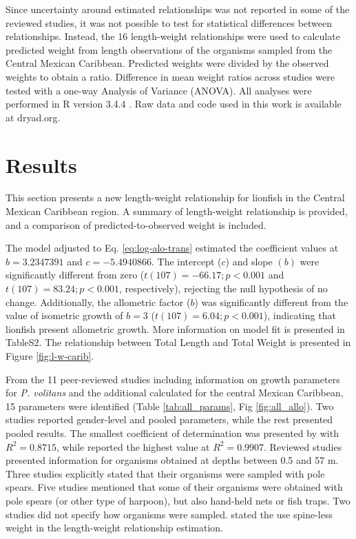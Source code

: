 \documentclass[fleqn,10pt,lineno]{wlpeerj} %
\theoremstyle{definition}
\theoremstyle{definition}
\theoremstyle{definition}
\theoremstyle{remark}
\begin{document}
Since uncertainty around estimated relationships was not reported in
some of the reviewed studies, it was not possible to test for
statistical differences between relationships. Instead, the 16
length-weight relationships were used to calculate predicted weight from
length observations of the organisms sampled from the Central Mexican
Caribbean. Predicted weights were divided by the observed weights to
obtain a ratio. Difference in mean weight ratios across studies were
tested with a one-way Analysis of Variance (ANOVA). All analyses were
performed in R version 3.4.4 \citep{rcore_2018}. Raw data and code used
in this work is available at dryad.org.

\section*{Results}

This section presents a new length-weight relationship for lionfish in
the Central Mexican Caribbean region. A summary of length-weight
relationship is provided, and a comparison of predicted-to-observed
weight is included.

The model adjusted to Eq. \ref{eq:log-alo-trans} estimated the
coefficient values at \(b = 3.2347391\) and \(c = -5.4940866\). The
intercept (\(c\)) and slope \((b)\) were significantly different from
zero (\(t(107) = -66.17; p<0.001\) and \(t(107) = 83.24; p<0.001\),
respectively), rejecting the null hypothesis of no change. Additionally,
the allometric factor (\(b\)) was significantly different from the value
of isometric growth of \(b = 3\) (\(t(107) = 6.04; p<0.001\)),
indicating that lionfish present allometric growth. More information on
model fit is presented in TableS2. The relationship between Total Length
and Total Weight is presented in Figure \ref{fig:l-w-carib}.

From the 11 peer-reviewed studies including information on growth
parameters for \emph{P. volitans} and the additional calculated for the
central Mexican Caribbean, 15 parameters were identified (Table
\ref{tab:all_params}, Fig \ref{fig:all_allo}). Two studies
\citep{aguilarperera_2016,fogg_2013} reported gender-level and pooled
parameters, while the rest presented pooled results. The smallest
coefficient of determination was presented by \citet{chin_2016} with
\(R^2 = 0.8715\), while \citet{sabidoitza_2016} reported the highest
value at \(R^2 = 0.9907\). Reviewed studies presented information for
organisms obtained at depths between 0.5 and 57 m. Three studies
\citep{aguilarperera_2016,chin_2016,dahl_2014} explicitly stated that
their organisms were sampled with pole spears. Five studies
\citep{sandel_2015,barbour_2011,fogg_2013,edwards_2014,sabidoitza_2016,toledohernndez_2014}
mentioned that some of their organisms were obtained with pole spears
(or other type of harpoon), but also hand-held nets or fish traps. Two
studies \citep{deleon_2013,darling_2011} did not specify how organisms
were sampled. \citep{fogg_2013} stated the use spine-less weight in the
length-weight relationship estimation.
\end{document}
